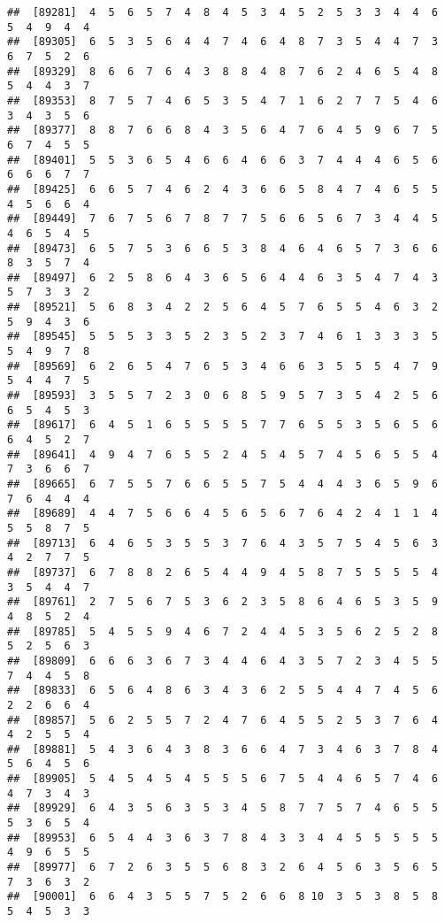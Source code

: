 \documentclass[
]{book}
\begin{document}
\begin{verbatim}
##  [89281]  4  5  6  5  7  4  8  4  5  3  4  5  2  5  3  3  4  4  6  5  4  9  4  4
##  [89305]  6  5  3  5  6  4  4  7  4  6  4  8  7  3  5  4  4  7  3  6  7  5  2  6
##  [89329]  8  6  6  7  6  4  3  8  8  4  8  7  6  2  4  6  5  4  8  5  4  4  3  7
##  [89353]  8  7  5  7  4  6  5  3  5  4  7  1  6  2  7  7  5  4  6  3  4  3  5  6
##  [89377]  8  8  7  6  6  8  4  3  5  6  4  7  6  4  5  9  6  7  5  6  7  4  5  5
##  [89401]  5  5  3  6  5  4  6  6  4  6  6  3  7  4  4  4  6  5  6  6  6  6  7  7
##  [89425]  6  6  5  7  4  6  2  4  3  6  6  5  8  4  7  4  6  5  5  4  5  6  6  4
##  [89449]  7  6  7  5  6  7  8  7  7  5  6  6  5  6  7  3  4  4  5  4  6  5  4  5
##  [89473]  6  5  7  5  3  6  6  5  3  8  4  6  4  6  5  7  3  6  6  8  3  5  7  4
##  [89497]  6  2  5  8  6  4  3  6  5  6  4  4  6  3  5  4  7  4  3  5  7  3  3  2
##  [89521]  5  6  8  3  4  2  2  5  6  4  5  7  6  5  5  4  6  3  2  5  9  4  3  6
##  [89545]  5  5  5  3  3  5  2  3  5  2  3  7  4  6  1  3  3  3  5  5  4  9  7  8
##  [89569]  6  2  6  5  4  7  6  5  3  4  6  6  3  5  5  5  4  7  9  5  4  4  7  5
##  [89593]  3  5  5  7  2  3  0  6  8  5  9  5  7  3  5  4  2  5  6  6  5  4  5  3
##  [89617]  6  4  5  1  6  5  5  5  5  7  7  6  5  5  3  5  6  5  6  6  4  5  2  7
##  [89641]  4  9  4  7  6  5  5  2  4  5  4  5  7  4  5  6  5  5  4  7  3  6  6  7
##  [89665]  6  7  5  5  7  6  6  5  5  7  5  4  4  4  3  6  5  9  6  7  6  4  4  4
##  [89689]  4  4  7  5  6  6  4  5  6  5  6  7  6  4  2  4  1  1  4  5  5  8  7  5
##  [89713]  6  4  6  5  3  5  5  3  7  6  4  3  5  7  5  4  5  6  3  4  2  7  7  5
##  [89737]  6  7  8  8  2  6  5  4  4  9  4  5  8  7  5  5  5  5  4  3  5  4  4  7
##  [89761]  2  7  5  6  7  5  3  6  2  3  5  8  6  4  6  5  3  5  9  4  8  5  2  4
##  [89785]  5  4  5  5  9  4  6  7  2  4  4  5  3  5  6  2  5  2  8  5  2  5  6  3
##  [89809]  6  6  6  3  6  7  3  4  4  6  4  3  5  7  2  3  4  5  5  7  4  4  5  8
##  [89833]  6  5  6  4  8  6  3  4  3  6  2  5  5  4  4  7  4  5  6  2  2  6  6  4
##  [89857]  5  6  2  5  5  7  2  4  7  6  4  5  5  2  5  3  7  6  4  4  2  5  5  4
##  [89881]  5  4  3  6  4  3  8  3  6  6  4  7  3  4  6  3  7  8  4  5  6  4  5  6
##  [89905]  5  4  5  4  5  4  5  5  5  6  7  5  4  4  6  5  7  4  6  4  7  3  4  3
##  [89929]  6  4  3  5  6  3  5  3  4  5  8  7  7  5  7  4  6  5  5  5  3  6  5  4
##  [89953]  6  5  4  4  3  6  3  7  8  4  3  3  4  4  5  5  5  5  5  4  9  6  5  5
##  [89977]  6  7  2  6  3  5  5  6  8  3  2  6  4  5  6  3  5  6  5  7  3  6  3  2
##  [90001]  6  6  4  3  5  5  7  5  2  6  6  8 10  3  5  3  8  5  8  5  4  5  3  3

\end{verbatim}
\end{document}
